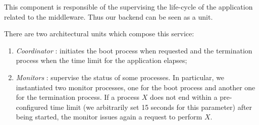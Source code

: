 
This component is responsible of the supervising the life-cycle of the
application related to the middleware. Thus our backend can be seen as a unit.

There are two architectural units which compose this service:

\begin{enumerate}
\item \textit{Coordinator} : initiates the boot process when requested and the
  termination process when the time limit for the application elapses;
\item \textit{Monitors} : supervise the status of some processes. In
  particular, we instantiated two monitor processes, one for the boot process
  and another one for the termination process. If a process $X$ does not end
  within a pre-configured time limit (we arbitrarily set 15 seconds for this
  parameter) after being started, the monitor issues again a request to
  perform $X$.
\end{enumerate}
